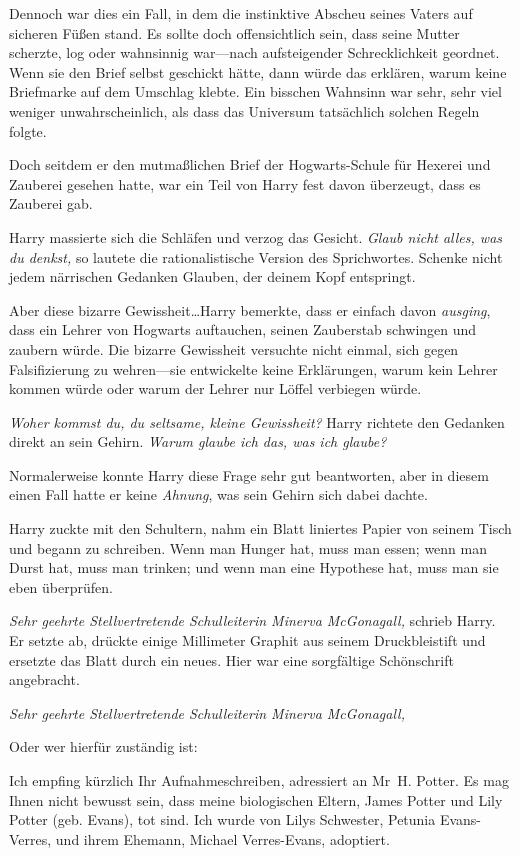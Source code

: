 {Dennoch war dies ein Fall, in dem die instinktive Abscheu seines Vaters auf sicheren Füßen stand. Es sollte doch offensichtlich sein, dass seine Mutter scherzte, log oder wahnsinnig war—nach aufsteigender Schrecklichkeit geordnet. Wenn sie den Brief selbst geschickt hätte, dann würde das erklären, warum keine Briefmarke auf dem Umschlag klebte. Ein bisschen Wahnsinn war sehr, sehr viel weniger unwahrscheinlich, als dass das Universum tatsächlich solchen Regeln folgte.

Doch seitdem er den mutmaßlichen Brief der Hogwarts-Schule für Hexerei und Zauberei gesehen hatte, war ein Teil von Harry fest davon überzeugt, dass es Zauberei gab.

Harry massierte sich die Schläfen und verzog das Gesicht. \emph{Glaub nicht alles, was du denkst,} so lautete die rationalistische Version des Sprichwortes. Schenke nicht jedem närrischen Gedanken Glauben, der deinem Kopf entspringt.

Aber diese bizarre Gewissheit…Harry bemerkte, dass er einfach davon \emph{ausging}, dass ein Lehrer von Hogwarts auftauchen, seinen Zauberstab schwingen und zaubern würde. Die bizarre Gewissheit versuchte nicht einmal, sich gegen Falsifizierung zu wehren—sie entwickelte keine Erklärungen, warum kein Lehrer kommen würde oder warum der Lehrer nur Löffel verbiegen würde.

\emph{Woher kommst du, du seltsame, kleine Gewissheit?} Harry richtete den Gedanken direkt an sein Gehirn. \emph{Warum glaube ich das, was ich glaube?}

Normalerweise konnte Harry diese Frage sehr gut beantworten, aber in diesem einen Fall hatte er keine \emph{Ahnung}, was sein Gehirn sich dabei dachte.

Harry zuckte mit den Schultern, nahm ein Blatt liniertes Papier von seinem Tisch und begann zu schreiben. Wenn man Hunger hat, muss man essen; wenn man Durst hat, muss man trinken; und wenn man eine Hypothese hat, muss man sie eben überprüfen.

\emph{Sehr geehrte Stellvertretende Schulleiterin Minerva McGonagall,} schrieb Harry. Er setzte ab, drückte einige Millimeter Graphit aus seinem Druckbleistift und ersetzte das Blatt durch ein neues. Hier war eine sorgfältige Schönschrift angebracht.

\emph{Sehr geehrte Stellvertretende Schulleiterin Minerva McGonagall,}

Oder wer hierfür zuständig ist:

Ich empfing kürzlich Ihr Aufnahmeschreiben, adressiert an Mr~H. Potter. Es mag Ihnen nicht bewusst sein, dass meine biologischen Eltern, James Potter und Lily Potter (geb. Evans), tot sind. Ich wurde von Lilys Schwester, Petunia Evans-Verres, und ihrem Ehemann, Michael Verres-Evans, adoptiert.

}
